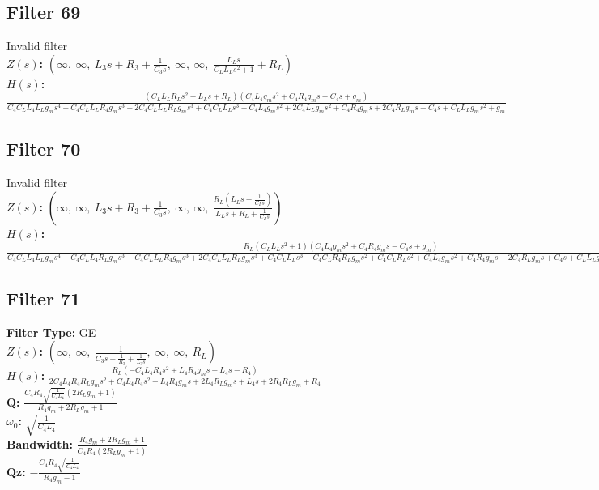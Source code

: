 \documentclass{article}
\begin{document}
\subsection*{Filter 69}
Invalid filter \\ 
\textbf{$Z(s)$:} $\left( \infty, \  \infty, \  L_{3} s + R_{3} + \frac{1}{C_{3} s}, \  \infty, \  \infty, \  \frac{L_{L} s}{C_{L} L_{L} s^{2} + 1} + R_{L}\right)$ \\ 
\textbf{$H(s)$:} $\frac{\left(C_{L} L_{L} R_{L} s^{2} + L_{L} s + R_{L}\right) \left(C_{4} L_{4} g_{m} s^{2} + C_{4} R_{4} g_{m} s - C_{4} s + g_{m}\right)}{C_{4} C_{L} L_{4} L_{L} g_{m} s^{4} + C_{4} C_{L} L_{L} R_{4} g_{m} s^{3} + 2 C_{4} C_{L} L_{L} R_{L} g_{m} s^{3} + C_{4} C_{L} L_{L} s^{3} + C_{4} L_{4} g_{m} s^{2} + 2 C_{4} L_{L} g_{m} s^{2} + C_{4} R_{4} g_{m} s + 2 C_{4} R_{L} g_{m} s + C_{4} s + C_{L} L_{L} g_{m} s^{2} + g_{m}}$ \\ 
\subsection*{Filter 70}
Invalid filter \\ 
\textbf{$Z(s)$:} $\left( \infty, \  \infty, \  L_{3} s + R_{3} + \frac{1}{C_{3} s}, \  \infty, \  \infty, \  \frac{R_{L} \left(L_{L} s + \frac{1}{C_{L} s}\right)}{L_{L} s + R_{L} + \frac{1}{C_{L} s}}\right)$ \\ 
\textbf{$H(s)$:} $\frac{R_{L} \left(C_{L} L_{L} s^{2} + 1\right) \left(C_{4} L_{4} g_{m} s^{2} + C_{4} R_{4} g_{m} s - C_{4} s + g_{m}\right)}{C_{4} C_{L} L_{4} L_{L} g_{m} s^{4} + C_{4} C_{L} L_{4} R_{L} g_{m} s^{3} + C_{4} C_{L} L_{L} R_{4} g_{m} s^{3} + 2 C_{4} C_{L} L_{L} R_{L} g_{m} s^{3} + C_{4} C_{L} L_{L} s^{3} + C_{4} C_{L} R_{4} R_{L} g_{m} s^{2} + C_{4} C_{L} R_{L} s^{2} + C_{4} L_{4} g_{m} s^{2} + C_{4} R_{4} g_{m} s + 2 C_{4} R_{L} g_{m} s + C_{4} s + C_{L} L_{L} g_{m} s^{2} + C_{L} R_{L} g_{m} s + g_{m}}$ \\ 
\subsection*{Filter 71}
\textbf{Filter Type:} GE \\ 
\textbf{$Z(s)$:} $\left( \infty, \  \infty, \  \frac{1}{C_{3} s + \frac{1}{R_{3}} + \frac{1}{L_{3} s}}, \  \infty, \  \infty, \  R_{L}\right)$ \\ 
\textbf{$H(s)$:} $\frac{R_{L} \left(- C_{4} L_{4} R_{4} s^{2} + L_{4} R_{4} g_{m} s - L_{4} s - R_{4}\right)}{2 C_{4} L_{4} R_{4} R_{L} g_{m} s^{2} + C_{4} L_{4} R_{4} s^{2} + L_{4} R_{4} g_{m} s + 2 L_{4} R_{L} g_{m} s + L_{4} s + 2 R_{4} R_{L} g_{m} + R_{4}}$ \\ 
\textbf{Q:} $\frac{C_{4} R_{4} \sqrt{\frac{1}{C_{4} L_{4}}} \left(2 R_{L} g_{m} + 1\right)}{R_{4} g_{m} + 2 R_{L} g_{m} + 1}$ \\ 
\textbf{$\omega_0$:} $\sqrt{\frac{1}{C_{4} L_{4}}}$ \\ 
\textbf{Bandwidth:} $\frac{R_{4} g_{m} + 2 R_{L} g_{m} + 1}{C_{4} R_{4} \left(2 R_{L} g_{m} + 1\right)}$ \\ 
\textbf{Qz:} $- \frac{C_{4} R_{4} \sqrt{\frac{1}{C_{4} L_{4}}}}{R_{4} g_{m} - 1}$ \\ 
\end{document}
